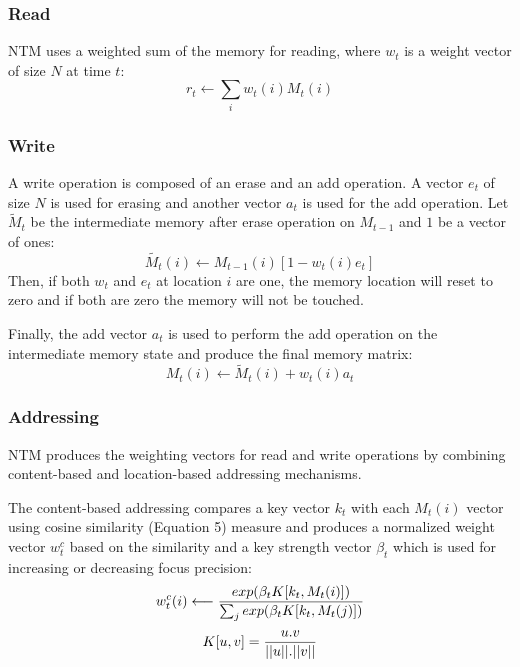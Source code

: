 \documentclass[acmsmall]{acmart}
\begin{document}
\subsubsection{Read}
NTM uses a weighted sum of the memory for reading, where $w_t$ is a weight vector of size $N$ at time $t$:
\begin{equation}
r_t \longleftarrow \sum_{i} w_t(i)M_t(i)
\end{equation}

\subsubsection{Write}
A write operation is composed of an erase and an add operation. A vector $e_t$ of size $N$ is used for erasing and another vector $a_t$ is used for the add operation. Let $\tilde{M}_t$ be the intermediate memory after erase operation on $M_{t-1}$ and $1$ be a vector of ones:
\begin{equation}
\tilde{M_t}(i) \longleftarrow M_{t-1}(i)[1-w_t(i)e_t]
\end{equation}
Then, if both $w_t$ and $e_t$ at location $i$ are one, the memory location will reset to zero and if both are zero the memory will not be touched.

Finally, the add vector $a_t$ is used to perform the add operation on the intermediate memory state and produce the final memory matrix:
\begin{equation}
M_t(i) \longleftarrow \tilde{M}_t(i)+w_t(i)a_t
\end{equation}

\subsubsection{Addressing}
NTM produces the weighting vectors for read and write operations by combining content-based and location-based addressing mechanisms.

The content-based addressing compares a key vector $k_t$ with each $M_t(i)$ vector using cosine similarity (Equation 5) measure and produces a normalized weight vector $w_t^c$ based on the similarity and a key strength vector $\beta_t$ which is used for increasing or decreasing focus precision:
\begin{equation}
w_t^c(i) \longleftarrow {{exp(\beta_t K[k_t, M_t(i)])} \over {\sum_{j} exp(\beta_t K[k_t,M_t(j)])}}
\end{equation}
\begin{equation}
K[u,v] = {{u.v} \over {||u||.||v||}}
\end{equation}
\end{document}
